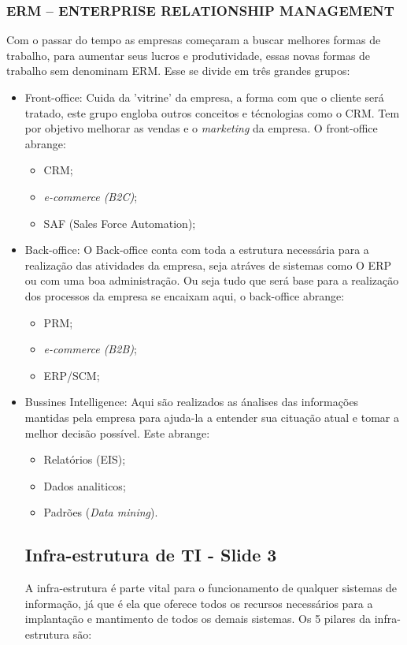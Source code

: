 \documentclass[
	12pt,				%
	openany,			%
	a4paper,			%
	chapter=TITLE,		%
	section=TITLE,		%
	english,
	brazil				%
]{abntex2}
\begin{document}
\begin{itemize}
\begin{itemize}
	\subsection{ERM – ENTERPRISE RELATIONSHIP MANAGEMENT}
	Com o passar do tempo as empresas começaram a buscar melhores formas de trabalho, para aumentar seus lucros e produtividade, essas novas formas de trabalho sem denominam ERM.
	Esse se divide em três grandes grupos:
	\begin{itemize}
		\item Front-office: Cuida da 'vitrine' da empresa, a forma com que o cliente será tratado, este grupo engloba outros conceitos e técnologias como o CRM. Tem por objetivo melhorar as vendas e o \textit{marketing} da empresa. O front-office abrange:
			\begin{itemize}
				\item CRM;
				\item \textit{e-commerce (B2C)};
				\item SAF (Sales Force Automation);
			\end{itemize}
		\item Back-office: O Back-office conta com toda a estrutura necessária para a realização das atividades da empresa, seja atráves de sistemas como O ERP ou com uma boa administração. Ou seja tudo que será base para a realização dos processos da empresa se encaixam aqui, o back-office abrange:
			\begin{itemize}
				\item PRM;
				\item \textit{e-commerce (B2B)};
				\item ERP/SCM;
			\end{itemize}
		\item Bussines Intelligence: Aqui são realizados as ánalises das informações mantidas pela empresa para ajuda-la a entender sua cituação atual e tomar a melhor decisão possível. Este abrange:
			\begin{itemize}
			\item Relatórios (EIS);
			\item Dados analiticos;
			\item Padrões (\textit{Data mining}).
	\end{itemize}

	\chapter{Infra-estrutura de TI - Slide 3}

	A infra-estrutura é parte vital para o funcionamento de qualquer sistemas de informação, já que é ela que oferece todos os recursos necessários para a implantação e mantimento de todos os demais sistemas. Os 5 pilares da infra-estrutura são:


\end{itemize}
\end{itemize}
\end{itemize}
\end{document}
